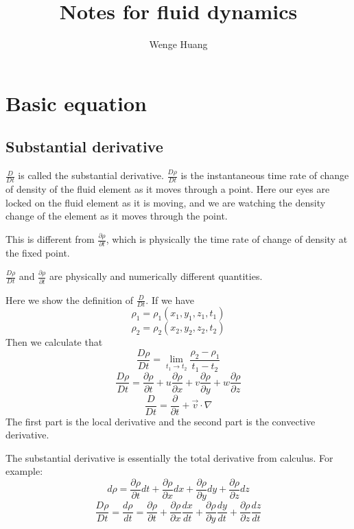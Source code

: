 \documentclass[11pt]{article} %
\title{Notes for fluid dynamics}
\author{Wenge Huang}
\begin{document}
\maketitle

\section{Basic equation}
\subsection{Substantial derivative}
\hspace{5mm}
$\frac{D}{Dt}$ is called the substantial derivative. $\frac{D\rho}{Dt}$ is the instantaneous time rate of change of density of the fluid element as it moves through a point. Here our eyes are locked on the fluid element as it is moving, and we are watching the density change of the element as it moves through the point. \par
This is different from $\frac{\partial \rho}{\partial t}$, which is physically the time rate of change of density at the fixed point. \par
$\frac{D\rho}{Dt}$ and $\frac{\partial \rho}{\partial t}$ are physically and numerically different quantities. \par
Here we show the definition of $\frac{D}{Dt}$. If we have
$$
\rho_{1} = \rho_{1}(x_{1}, y_{1}, z_{1}, t_{1})
$$
$$
\rho_{2} = \rho_{2}(x_{2}, y_{2}, z_{2}, t_{2})
$$
Then we calculate that
\begin{equation}
\frac{D\rho}{Dt} = \lim_{t_{1} \to t_{2}}\frac{\rho_{2}-\rho_{1}}{t_{1}-t_{2}}
\end{equation}
\begin{equation}
\frac{D\rho}{Dt} = \frac{\partial \rho}{\partial t}+u\frac{\partial \rho}{\partial x}+v\frac{\partial \rho}{\partial y}+w\frac{\partial \rho}{\partial z}
\end{equation}
\begin{equation}
\frac{D}{Dt} = \frac{\partial }{\partial t}+\vec{v}\cdot \nabla
\end{equation}
The first part is the local derivative and the second part is the convective derivative.\par
The substantial derivative is essentially the total derivative from calculus. For example:
$$
d\rho = \frac{\partial \rho}{\partial t}dt+\frac{\partial \rho}{\partial x}dx+\frac{\partial \rho}{\partial y}dy+\frac{\partial \rho}{\partial z}dz
$$
$$
\frac{D\rho}{Dt} = \frac{d \rho}{d t} = \frac{\partial \rho}{\partial t}+\frac{\partial \rho}{\partial x}\frac{dx}{dt}+\frac{\partial \rho}{\partial y}\frac{dy}{dt}+\frac{\partial \rho}{\partial z}\frac{dz}{dt}
$$
\end{document}
